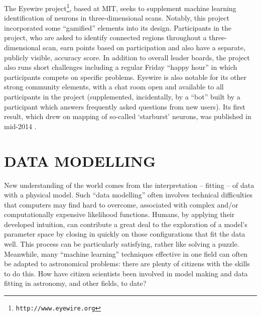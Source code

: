 \documentclass{ar2e}
\def\url#1{\texttt{#1}}
\begin{document}
The Eyewire project\footnote{\url{http://www.eyewire.org}}, based at MIT, seeks to supplement machine learning
identification of neurons in three-dimensional scans. Notably, this project
incorporated some ``gamified'' elements into its design. Participants in the
project, who are asked to identify connected regions throughout a
three-dimensional scan, earn points based on participation and also have a
separate, publicly visible, accuracy score.  In addition to overall leader
boards, the project also runs short challenges including a regular Friday
``happy hour'' in which participants compete on specific problems. Eyewire is
also notable for its other strong community elements, with a chat room open and
available to all participants in the project (supplemented, incidentally, by a
``bot'' built by a participant which answers frequently asked questions from new
users). Its first result, which drew on mapping of so-called `starburst' neurons, was 
published in mid-2014 \citep{KimEyewire}.




\section{DATA MODELLING}
\label{sec:model}

New understanding of the world comes from the interpretation -- fitting -- of
data with a physical model. Such ``data modelling'' often involves technical
difficulties that computers may find hard to overcome, associated with complex
and/or computationally expensive likelihood functions. Humans, by applying their
developed intuition, can contribute a great deal to the exploration of a model's
parameter space by closing in quickly on those configurations that fit the data
well. This process can be particularly satisfying, rather like solving a puzzle.
Meanwhile, many ``machine learning'' techniques effective in one field can often
be adapted to astronomical problems: there are plenty of citizens with the
skills to do this. How have citizen scientists been involved in model making and
data fitting in astronomy, and other fields, to date?

\end{document}
